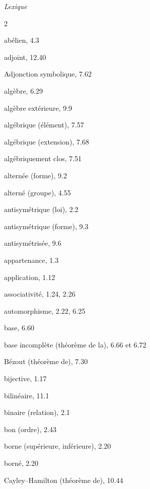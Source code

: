 \clearpage
{}
{}
\thispagestyle{plain}

\begin{center}
{\Huge\itshape\rmfamily\color{BellaLavenderDeep} Lexique}
\end{center}
\vspace{1.2em}

\begingroup
\small
\setlength{\parindent}{0pt}
\setlength{\parskip}{0.18em}
\raggedcolumns
\begin{multicols}{2}

abélien, 4.3

adjoint, 12.40

Adjonction symbolique, 7.62


algèbre, 6.29

algèbre extérieure, 9.9

algébrique (élément), 7.57

algébrique (extension), 7.68

algébriquement clos, 7.51

alternée (forme), 9.2

alterné (groupe), 4.55

antisymétrique (loi), 2.2

antisymétrique (forme), 9.3

antisymétrisée, 9.6

appartenance, 1.3

application, 1.12

associativité, 1.24, 2.26

automorphisme, 2.22, 6.25

\medskip
base, 6.60

base incomplète (théorème de la), 6.66 et 6.72

Bézout (théorème de), 7.30

bijective, 1.17

bilinéaire, 11.1

binaire (relation), 2.1

bon (ordre), 2.43

borne (supérieure, inférieure), 2.20

borné, 2.20

\medskip
Cayley--Hamilton (théorème de), 10.44


\end{multicols}
